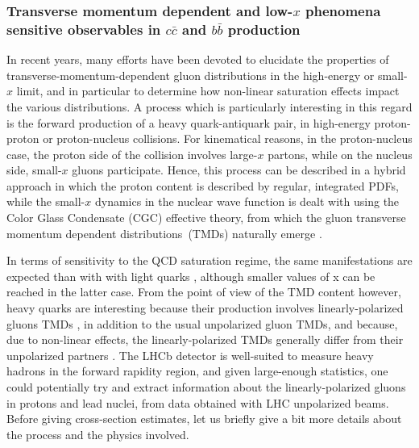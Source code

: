\documentclass[../report.tex]{subfiles}
\begin{document}
\subsubsection{Transverse momentum dependent and low-$x$ phenomena sensitive observables in $c\bar{c}$ and $b\bar{b}$ production }
\label{sec:cgctmd}

In recent years, many efforts have been devoted to elucidate the properties of transverse-momentum-dependent gluon distributions in the high-energy or small-$x$ limit, and in particular to determine how non-linear saturation effects impact the various distributions. A process which is particularly interesting in this regard is the forward production of a heavy quark-antiquark pair, in high-energy proton-proton or proton-nucleus collisions. For kinematical reasons, in the proton-nucleus case, the proton side of the collision involves large-$x$ partons, while on the nucleus side, small-$x$ gluons participate. Hence, this process can be described in a hybrid approach in which the proton content is described by regular, integrated PDFs, while the small-$x$ dynamics in the nuclear wave function is dealt with using the Color Glass Condensate (CGC) effective theory, from which the gluon transverse momentum dependent distributions~(TMDs)  naturally emerge \cite{Dominguez:2011wm,Marquet:2016cgx}.

In terms of sensitivity to the QCD saturation regime, the same manifestations are expected than with with light quarks \cite{Albacete:2018ruq}, although smaller values of x can be reached in the latter case. From the point of view of the TMD content however, heavy quarks are interesting because their production involves linearly-polarized gluons TMDs \cite{Akcakaya:2012si}, in addition to the usual unpolarized gluon TMDs, and because, due to non-linear effects, the linearly-polarized TMDs generally differ from their unpolarized partners \cite{Marquet:2017xwy}. The LHCb detector is well-suited to measure heavy hadrons in the forward rapidity region, and given large-enough statistics, one could potentially try and extract information about the linearly-polarized gluons in protons and lead nuclei, from data obtained with LHC unpolarized beams. Before giving cross-section estimates, let us briefly give a bit more details about the process and the physics involved.
\end{document}
